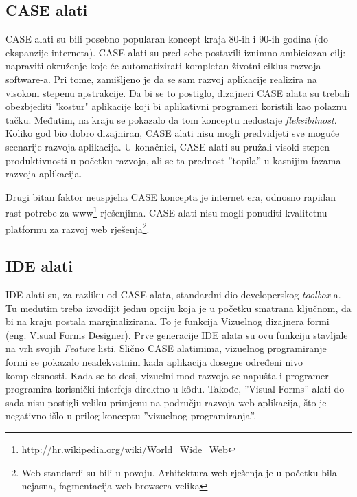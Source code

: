 \documentclass[times, utf8, seminar]{fit}
\begin{document}
\subsection{CASE alati}

CASE alati su bili posebno popularan koncept kraja 80-ih i 90-ih godina (do ekspanzije interneta). CASE alati su pred sebe postavili iznimno ambiciozan cilj: napraviti okruženje koje će automatizirati kompletan životni ciklus razvoja software-a. Pri tome, zamišljeno je da se sam razvoj aplikacije realizira na visokom stepenu apstrakcije. Da bi se to postiglo, dizajneri CASE alata su trebali obezbjediti "kostur" aplikacije koji bi aplikativni programeri koristili kao polaznu tačku. Međutim, na kraju se pokazalo da tom konceptu nedostaje \emph{fleksibilnost}. Koliko god bio dobro dizajniran,  CASE alati nisu mogli predvidjeti sve moguće scenarije razvoja aplikacija. U konačnici, CASE alati su pružali visoki stepen produktivnosti u početku razvoja, ali se ta prednost ''topila'' u kasnijim fazama razvoja aplikacija. 

Drugi bitan faktor neuspjeha CASE koncepta je internet era, odnosno rapidan rast potrebe za www\footnote{\url{http://hr.wikipedia.org/wiki/World_Wide_Web}} rješenjima. CASE alati nisu mogli ponuditi kvalitetnu platformu za razvoj web rješenja\footnote{Web standardi su bili u povoju. Arhitektura web rješenja je u početku bila nejasna, fagmentacija web browsera velika}.

\subsection{IDE alati}

IDE alati su, za razliku od CASE alata, standardni dio developerskog \emph{toolbox}-a. Tu međutim treba izvodijit jednu opciju koja je u početku smatrana ključnom, da bi na kraju postala marginalizirana. To je funkcija Vizuelnog dizajnera formi (eng. Visual Forms Designer). Prve generacije IDE alata su ovu funkciju stavljale na vrh svojih \emph{Feature} listi. Slično CASE alatimima,  vizuelnog programiranje formi se pokazalo neadekvatnim kada aplikacija dosegne određeni nivo kompleksnosti. Kada se to desi, vizuelni mod razvoja se napušta i programer programira korisnički interfejs direktno u k\^odu. Takođe, ''Visual Forms'' alati do sada nisu postigli veliku primjenu na području razvoja web aplikacija, što je negativno išlo u prilog konceptu ''vizuelnog programiranja''. 
\end{document}
